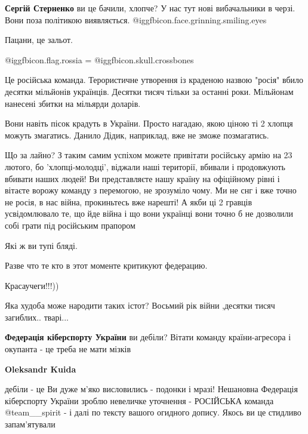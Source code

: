 \begin{itemize}
\textbf{Сергій Стерненко} ви це бачили, хлопче? У нас тут нові вибачальники в черзі. Вони поза політикою виявляється.  @igg{fbicon.face.grinning.smiling.eyes} 

Пацани, це зальот.


@igg{fbicon.flag.rossia} = @igg{fbicon.skull.crossbones}

Це російська команда. Терористичне утворення із краденою назвою "росія" вбило
десятки мільйонів українців. Десятки тисяч тільки за останні роки. Мільйонам
нанесені збитки на мільярди доларів.

Вони навіть пісок крадуть в України. Просто нагадаю, якою ціною ті 2 хлопця
можуть змагатись. Данило Дідик, наприклад, вже не зможе позмагатись.


Що за лайно? З таким самим успіхом можете привітати російську армію на 23
лютого, бо 'хлопці-молодці', віджали наші території, вбивали і продовжують
вбивати наших людей! Ви представляєте нашу країну на офіційному рівні і вітаєте
ворожу команду з перемогою, не зрозуміло чому. Ми не снг і вже точно не росія,
в нас війна, прокиньтесь вже нарешті! А якби ці 2 гравців усвідомлювало те, що
йде війна і що вони українці вони точно б не дозволили собі грати під
російським прапором

Які ж ви тупі бляді.

\begin{itemize} %
Разве что те кто в этот моменте критикуют федерацию.
\end{itemize} %

Красаучеги!!!))

Яка худоба може народити таких істот? Восьмий рік війни ,десятки тисяч загиблих.. тварі...

\textbf{Федерація кіберспорту України} ви дебіли? Вітати команду країни-агресора і окупанта - це треба не мати мізків

\begin{itemize} %
\textbf{Oleksandr Kuida} 

дебіли - це Ви дуже м'яко висловились - подонки і мразі! Нешановна Федерація
кіберспорту України зроблю невеличке уточнення - РОСІЙСЬКА команда
@team\_\_spirit - і далі по тексту вашого огидного допису. Якось ви це стидливо
запам'ятували


\end{itemize}
\end{itemize}
